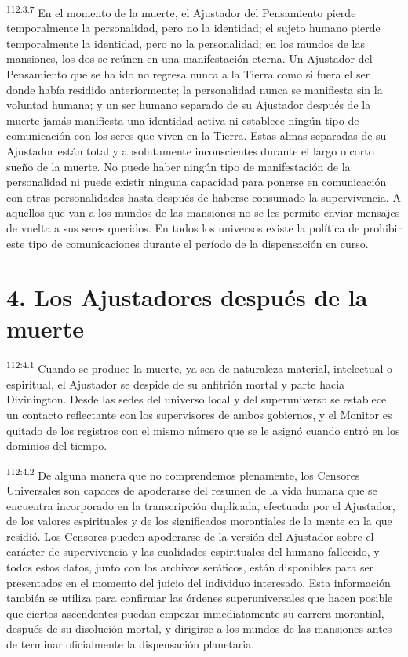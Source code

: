 \documentclass[twoside, 11pt]{book}
\begin{document}
\par
\textsuperscript{112:3.7} En el momento de la muerte, el Ajustador del Pensamiento pierde temporalmente la personalidad, pero no la identidad; el sujeto humano pierde temporalmente la identidad, pero no la personalidad; en los mundos de las mansiones, los dos se reúnen en una manifestación eterna. Un Ajustador del Pensamiento que se ha ido no regresa nunca a la Tierra como si fuera el ser donde había residido anteriormente; la personalidad nunca se manifiesta sin la voluntad humana; y un ser humano separado de su Ajustador después de la muerte jamás manifiesta una identidad activa ni establece ningún tipo de comunicación con los seres que viven en la Tierra. Estas almas separadas de su Ajustador están total y absolutamente inconscientes durante el largo o corto sueño de la muerte. No puede haber ningún tipo de manifestación de la personalidad ni puede existir ninguna capacidad para ponerse en comunicación con otras personalidades hasta después de haberse consumado la supervivencia. A aquellos que van a los mundos de las mansiones no se les permite enviar mensajes de vuelta a sus seres queridos. En todos los universos existe la política de prohibir este tipo de comunicaciones durante el período de la dispensación en curso.

\section*{4. Los Ajustadores después de la muerte}
\par
\textsuperscript{112:4.1} Cuando se produce la muerte, ya sea de naturaleza material, intelectual o espiritual, el Ajustador se despide de su anfitrión mortal y parte hacia Divinington. Desde las sedes del universo local y del superuniverso se establece un contacto reflectante con los supervisores de ambos gobiernos, y el Monitor es quitado de los registros con el mismo número que se le asignó cuando entró en los dominios del tiempo.

\par
\textsuperscript{112:4.2} De alguna manera que no comprendemos plenamente, los Censores Universales son capaces de apoderarse del resumen de la vida humana que se encuentra incorporado en la transcripción duplicada, efectuada por el Ajustador, de los valores espirituales y de los significados morontiales de la mente en la que residió. Los Censores pueden apoderarse de la versión del Ajustador sobre el carácter de supervivencia y las cualidades espirituales del humano fallecido, y todos estos datos, junto con los archivos seráficos, están disponibles para ser presentados en el momento del juicio del individuo interesado. Esta información también se utiliza para confirmar las órdenes superuniversales que hacen posible que ciertos ascendentes puedan empezar inmediatamente su carrera morontial, después de su disolución mortal, y dirigirse a los mundos de las mansiones antes de terminar oficialmente la dispensación planetaria.
\end{document}
